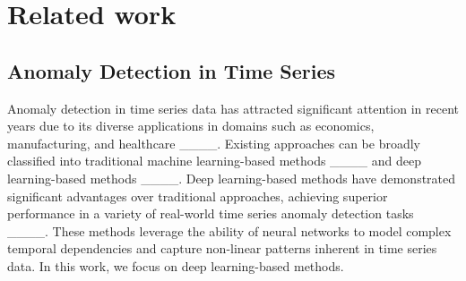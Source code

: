 \section{Related work}
\label{sec:related_work}
\subsection{Anomaly Detection in Time Series}
Anomaly detection in time series data has attracted significant attention in recent years due to its diverse applications in domains such as economics, manufacturing, and healthcare ____. Existing approaches can be broadly classified into traditional machine learning-based methods ____ and deep learning-based methods ____. Deep learning-based methods have demonstrated significant advantages over traditional approaches, achieving superior performance in a variety of real-world time series anomaly detection tasks ____. These methods leverage the ability of neural networks to model complex temporal dependencies and capture non-linear patterns inherent in time series data. In this work, we focus on deep learning-based methods.





